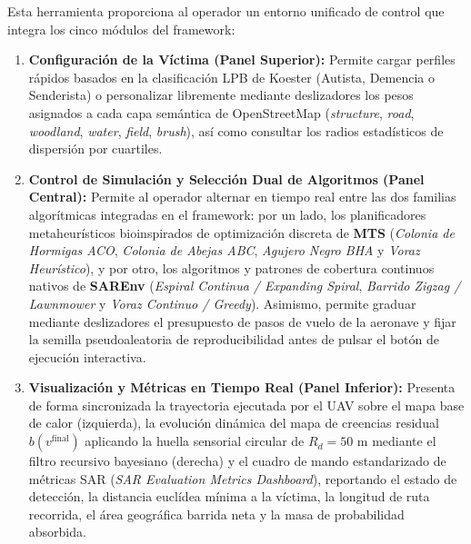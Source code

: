 Esta herramienta proporciona al operador un entorno unificado de control que integra los cinco módulos del framework:
\begin{enumerate}
    \item \textbf{Configuración de la Víctima (Panel Superior):} Permite cargar perfiles rápidos basados en la clasificación LPB de Koester \cite{koester2008lost} (Autista, Demencia o Senderista) o personalizar libremente mediante deslizadores los pesos asignados a cada capa semántica de OpenStreetMap (\textit{structure}, \textit{road}, \textit{woodland}, \textit{water}, \textit{field}, \textit{brush}), así como consultar los radios estadísticos de dispersión por cuartiles.
    \item \textbf{Control de Simulación y Selección Dual de Algoritmos (Panel Central):} Permite al operador alternar en tiempo real entre las dos familias algorítmicas integradas en el framework: por un lado, los planificadores metaheurísticos bioinspirados de optimización discreta de \textbf{MTS} (\textit{Colonia de Hormigas ACO}, \textit{Colonia de Abejas ABC}, \textit{Agujero Negro BHA} y \textit{Voraz Heurístico}), y por otro, los algoritmos y patrones de cobertura continuos nativos de \textbf{SAREnv} (\textit{Espiral Continua / Expanding Spiral}, \textit{Barrido Zigzag / Lawnmower} y \textit{Voraz Continuo / Greedy}). Asimismo, permite graduar mediante deslizadores el presupuesto de pasos de vuelo de la aeronave y fijar la semilla pseudoaleatoria de reproducibilidad antes de pulsar el botón de ejecución interactiva.
    \item \textbf{Visualización y Métricas en Tiempo Real (Panel Inferior):} Presenta de forma sincronizada la trayectoria ejecutada por el UAV sobre el mapa base de calor (izquierda), la evolución dinámica del mapa de creencias residual $b(v^{\text{final}})$ aplicando la huella sensorial circular de $R_d = 50\text{ m}$ mediante el filtro recursivo bayesiano (derecha) y el cuadro de mando estandarizado de métricas SAR (\textit{SAR Evaluation Metrics Dashboard}), reportando el estado de detección, la distancia euclídea mínima a la víctima, la longitud de ruta recorrida, el área geográfica barrida neta y la masa de probabilidad absorbida.
\end{enumerate}

